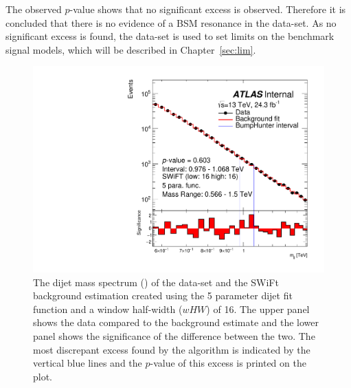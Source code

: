 The observed \bh{} $p$-value shows that no significant excess is observed.
Therefore it is concluded that there is no evidence of a BSM resonance in the \lm{} data-set.
As no significant excess is found, the \lm{} data-set is used to set limits on the benchmark signal models,
which will be described in Chapter~\ref{sec:lim}.

\begin{figure}[!thb]
\captionsetup[subfigure]{aboveskip=0pt,justification=centering}
\centering
  \includegraphics[width=0.7\linewidth, angle=0]{figs/Dibjet/LowMass/FitStudy_min566/bhFit_unblind_5para_low16_high16.pdf}
\vspace{3pt}
\caption[The dijet mass spectrum of the \lm{} data-set and the SWiFt background estimation.
        The most discrepant excess found by the \bh{} algorithm and the assosciated \mbox{$p$-value} are shown.]
        {\label{fig:bhFit_lm_unblind}
   The dijet mass spectrum (\mjj) of the \lm{} data-set and the SWiFt background estimation
   created using the 5 parameter dijet fit function and a window half-width ($wHW$) of 16. 
   The upper panel shows the data compared to the background estimate and the lower panel shows the significance of the difference between the two.
   The most discrepant excess found by the \bh{} algorithm is indicated by the vertical blue lines and the \mbox{$p$-value} of this excess is printed on the plot. }
\end{figure}





